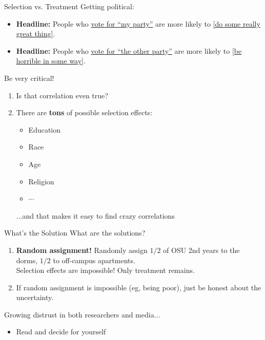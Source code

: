 \begin{frame}{Selection vs. Treatment}
    Getting political:
    \begin{itemize}
        \item \textbf{Headline:} People who \uline{vote for ``my party''} are more likely to \uline{[do some really great thing]}.
        \item \textbf{Headline:} People who \uline{vote for ``the other party''} are more likely to \uline{[be horrible in some way]}.
    \end{itemize}
    \bsk
    Be very critical!
    \begin{enumerate}
        \item Is that correlation even true?
        \item There are \textbf{tons} of possible selection effects:
        \begin{itemize}
            \item Education
            \item Race
            \item Age
            \item Religion
            \item $\cdots$
        \end{itemize}
        ...and that makes it easy to find crazy correlations
    \end{enumerate}
\end{frame}

\begin{frame}{What's the Solution}
    What are the solutions?
    \begin{enumerate}
        \item \textbf{Random assignment!} Randomly assign $1/2$ of OSU 2nd years to the dorms, $1/2$ to off-campus apartments.\\
        Selection effects are impossible! Only treatment remains.
        \item If random assignment is impossible (eg, being poor), just be honest about the uncertainty.
    \end{enumerate}
    \bsk
    Growing distrust in both researchers and media...
    \begin{itemize}
        \item Read and decide for yourself
    \end{itemize}
\end{frame}

